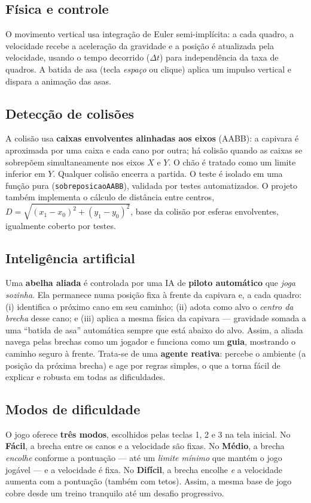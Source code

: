 \documentclass[12pt]{article}
\begin{document}
\subsection{Física e controle}
O movimento vertical usa integração de Euler semi-implícita: a cada quadro,
a velocidade recebe a aceleração da gravidade e a posição é atualizada pela
velocidade, usando o tempo decorrido ($\Delta t$) para independência da taxa
de quadros. A batida de asa (tecla \emph{espaço} ou clique) aplica um
impulso vertical e dispara a animação das asas.

\subsection{Detecção de colisões}
A colisão usa \textbf{caixas envolventes alinhadas aos eixos} (AABB): a
capivara é aproximada por uma caixa e cada cano por outra; há colisão quando
as caixas se sobrepõem simultaneamente nos eixos $X$ e $Y$. O chão é tratado
como um limite inferior em $Y$. Qualquer colisão encerra a partida. O teste é
isolado em uma função pura (\texttt{sobreposicaoAABB}), validada por testes
automatizados. O projeto também implementa o cálculo de distância entre
centros, $D=\sqrt{(x_1-x_0)^2+(y_1-y_0)^2}$, base da colisão por esferas
envolventes, igualmente coberto por testes.

\subsection{Inteligência artificial}
Uma \textbf{abelha aliada} é controlada por uma IA de \textbf{piloto
automático} que \emph{joga sozinha}. Ela permanece numa posição fixa à
frente da capivara e, a cada quadro: (i) identifica o próximo cano em seu
caminho; (ii) adota como alvo o \emph{centro da brecha} desse cano; e (iii)
aplica a mesma física da capivara --- gravidade somada a uma ``batida de
asa'' automática sempre que está abaixo do alvo. Assim, a aliada navega
pelas brechas como um jogador e funciona como um \textbf{guia}, mostrando o
caminho seguro à frente. Trata-se de uma \textbf{agente reativa}: percebe o
ambiente (a posição da próxima brecha) e age por regras simples, o que a
torna fácil de explicar e robusta em todas as dificuldades.

\subsection{Modos de dificuldade}
O jogo oferece \textbf{três modos}, escolhidos pelas teclas 1, 2 e 3 na tela
inicial. No \textbf{Fácil}, a brecha entre os canos e a velocidade são fixas.
No \textbf{Médio}, a brecha \emph{encolhe} conforme a pontuação --- até um
\emph{limite mínimo} que mantém o jogo jogável --- e a velocidade é fixa. No
\textbf{Difícil}, a brecha encolhe \emph{e} a velocidade aumenta com a
pontuação (também com tetos). Assim, a mesma base de jogo cobre desde um
treino tranquilo até um desafio progressivo.
\end{document}
